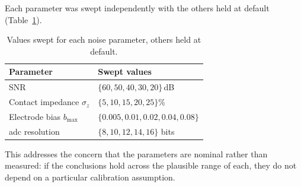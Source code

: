 Each parameter was swept independently with the others held at default (Table~\ref{tab:sensitivity-sweep-values}).

\begin{table}[htbp]
\centering
\caption[Noise parameter sweep values]{Values swept for each noise parameter, others held at default.}
\label{tab:sensitivity-sweep-values}
\small
\begin{tabular}{@{}ll@{}}
\toprule
\textbf{Parameter} & \textbf{Swept values} \\
\midrule
SNR & $\{60, 50, 40, 30, 20\}$\,dB \\
Contact impedance $\sigma_z$ & $\{5, 10, 15, 20, 25\}\%$ \\
Electrode bias $b_{\max}$ & $\{0.005, 0.01, 0.02, 0.04, 0.08\}$ \\
\gls{adc} resolution & $\{8, 10, 12, 14, 16\}$ bits \\
\bottomrule
\end{tabular}
\end{table}

\noindent This addresses the concern that the parameters are nominal rather than measured: if the conclusions hold across the plausible range of each, they do not depend on a particular calibration assumption.

